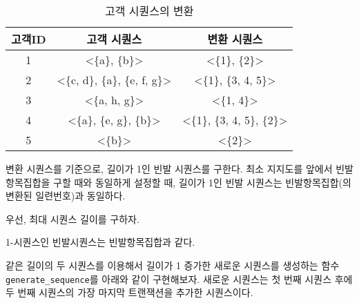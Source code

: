 \documentclass[]{book}
\newenvironment{Shaded}{\begin{snugshade}}{\end{snugshade}}
\newcommand{\DataTypeTok}[1]{\textcolor[rgb]{0.13,0.29,0.53}{#1}}
\newcommand{\DecValTok}[1]{\textcolor[rgb]{0.00,0.00,0.81}{#1}}
\newcommand{\KeywordTok}[1]{\textcolor[rgb]{0.13,0.29,0.53}{\textbf{#1}}}
\newcommand{\NormalTok}[1]{#1}
\newcommand{\OperatorTok}[1]{\textcolor[rgb]{0.81,0.36,0.00}{\textbf{#1}}}
\newcommand{\StringTok}[1]{\textcolor[rgb]{0.31,0.60,0.02}{#1}}
\begin{document}
\begin{table}[t]

\caption{\label{tab:association-transformed-sequence}고객 시퀀스의 변환}
\centering
\begin{tabular}{ccc}
\toprule
고객ID & 고객 시퀀스 & 변환 시퀀스\\
\midrule
1 & <\{a\}, \{b\}> & <\{1\}, \{2\}>\\
2 & <\{c, d\}, \{a\}, \{e, f, g\}> & <\{1\}, \{3, 4, 5\}>\\
3 & <\{a, h, g\}> & <\{1, 4\}>\\
4 & <\{a\}, \{e, g\}, \{b\}> & <\{1\}, \{3, 4, 5\}, \{2\}>\\
5 & <\{b\}> & <\{2\}>\\
\bottomrule
\end{tabular}
\end{table}

변환 시퀀스를 기준으로, 길이가 1인 빈발 시퀀스를 구한다. 최소 지지도를 앞에서 빈발항목집합을 구할 때와 동일하게 설정할 때, 길이가 1인 빈발 시퀀스는 빈발항목집합(의 변환된 일련번호)과 동일하다.

우선, 최대 시퀀스 길이를 구하자.

\begin{Shaded}
\end{Shaded}

1-시퀀스인 빈발시퀀스는 빈발항목집합과 같다.

\begin{Shaded}
\end{Shaded}

같은 길이의 두 시퀀스를 이용해서 길이가 1 증가한 새로운 시퀀스를 생성하는 함수 \texttt{generate\_sequence}를 아래와 같이 구현해보자. 새로운 시퀀스는 첫 번째 시퀀스 후에 두 번째 시퀀스의 가장 마지막 트랜잭션을 추가한 시퀀스이다.
\end{document}
